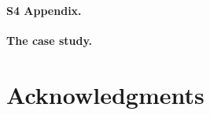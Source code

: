 \documentclass[10pt,letterpaper]{article}
\begin{document}
\paragraph*{S4 Appendix.}
\label{S4_Appendix}
{\bf The case study.}


\section*{Acknowledgments}

\nolinenumbers

%
%
% 


\end{document}
